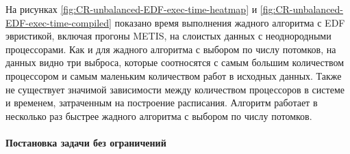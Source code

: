 На рисунках \ref{fig:CR-unbalanced-EDF-exec-time-heatmap} и \ref{fig:CR-unbalanced-EDF-exec-time-compiled} показано время выполнения жадного алгоритма с EDF эвристикой, включая прогоны METIS, на слоистых данных с неоднородными процессорами. Как и для жадного алгоритма с выбором по числу потомков, на данных видно три выброса, которые соотносятся с самым большим количеством процессором и самым маленьким количеством работ в исходных данных. Также не существует значимой зависимости между количеством процессоров в системе и временем, затраченным на построение расписания. Алгоритм работает в несколько раз быстрее жадного алгоритма с выбором по числу потомков.

\paragraph{Постановка задачи без ограничений}

